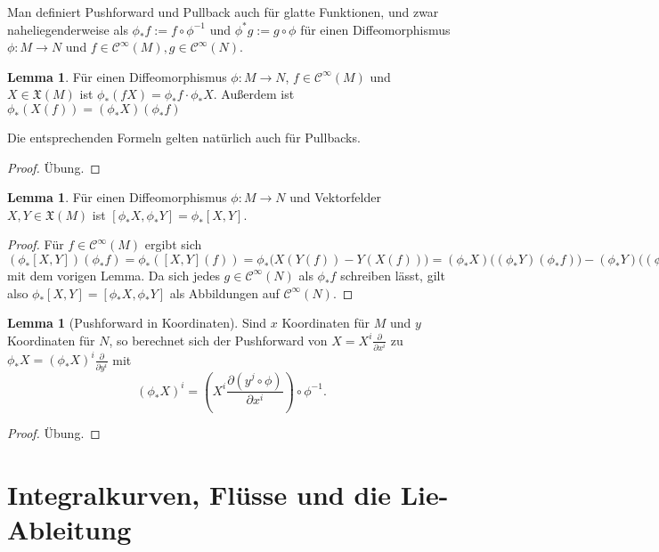 \documentclass[a4paper]{scrreprt}
\numberwithin{equation}{chapter}
\newcommand{\sC}{\mathcal{C}^{\infty}}
\theoremstyle{definition}
\newtheorem{lemma}[defn]{Lemma}
\newcommand{\bewUeb}{\begin{proof}Übung.\end{proof}}
\begin{document}
Man definiert Pushforward und Pullback auch für glatte Funktionen, und zwar naheliegenderweise als $\phi_*f := f \circ \phi^{-1}$ und $\phi^*g := g \circ \phi$ für einen Diffeomorphismus $\phi\colon M \to N$ und $f \in \sC(M), g \in \sC(N)$.

\begin{lemma} \label{lemma:transport_VF_funk}
	Für einen Diffeomorphismus $\phi\colon M \to N$, $f \in \sC(M)$ und $X \in \mathfrak X(M)$ ist $\phi_*(f X) = \phi_*f \cdot \phi_*X$. Außerdem ist $\phi_*(X(f)) = (\phi_*X)(\phi_*f)$

	Die entsprechenden Formeln gelten natürlich auch für Pullbacks.
	\bewUeb
\end{lemma}

\begin{lemma}
	Für einen Diffeomorphismus $\phi\colon M \to N$ und Vektorfelder $X, Y \in \mathfrak X(M)$ ist $[\phi_*X,\phi_*Y] = \phi_*[X,Y]$.

	\begin{proof}
		Für $f \in \sC(M)$ ergibt sich $(\phi_*[X,Y])(\phi_*f) = \phi_*([X,Y](f)) = \phi_*\Big(X(Y(f)) - Y(X(f))\Big) = (\phi_*X)\Big((\phi_*Y)(\phi_*f)\Big) - (\phi_*Y)\Big((\phi_*X)(\phi_*f)\Big) = [\phi_*X,\phi_*Y](\phi_*f)$ mit dem vorigen Lemma. Da sich jedes $g\in \sC(N)$ als $\phi_*f$ schreiben lässt, gilt also $\phi_*[X,Y] = [\phi_*X,\phi_*Y]$ als Abbildungen auf $\sC(N)$.
	\end{proof}
\end{lemma}

\begin{lemma}[Pushforward in Koordinaten]
	Sind $x$ Koordinaten für $M$ und $y$ Koordinaten für $N$, so berechnet sich der Pushforward von $X = X^i \frac{\partial}{\partial x^i}$ zu $\phi_*X = (\phi_*X)^i \frac{\partial}{\partial y^i}$ mit
	\[(\phi_*X)^i = \left(X^i \frac{\partial (y^j \circ \phi)}{\partial x^i}\right) \circ \phi^{-1}.\]
	\bewUeb
\end{lemma}

\section{Integralkurven, Flüsse und die Lie-Ableitung}
\end{document}
